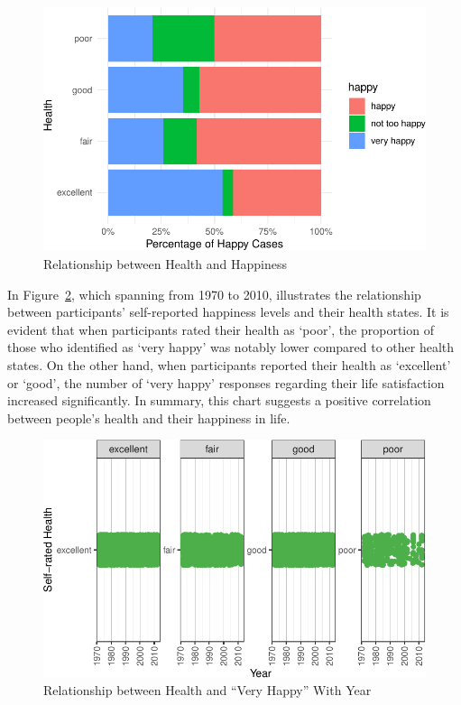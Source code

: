 \documentclass[
  letterpaper,
  DIV=11,
  numbers=noendperiod]{scrartcl}
\begin{document}
\begin{figure}

{\centering \includegraphics{paper_files/figure-pdf/fig-four-1.pdf}

}

\caption{\label{fig-four}Relationship between Health and Happiness}

\end{figure}

In Figure~\ref{fig-five}, which spanning from 1970 to 2010, illustrates
the relationship between participants' self-reported happiness levels
and their health states. It is evident that when participants rated
their health as `poor', the proportion of those who identified as `very
happy' was notably lower compared to other health states. On the other
hand, when participants reported their health as `excellent' or `good',
the number of `very happy' responses regarding their life satisfaction
increased significantly. In summary, this chart suggests a positive
correlation between people's health and their happiness in life.

\begin{figure}

{\centering \includegraphics{paper_files/figure-pdf/fig-five-1.pdf}

}

\caption{\label{fig-five}Relationship between Health and ``Very Happy''
With Year}

\end{figure}
\end{document}

